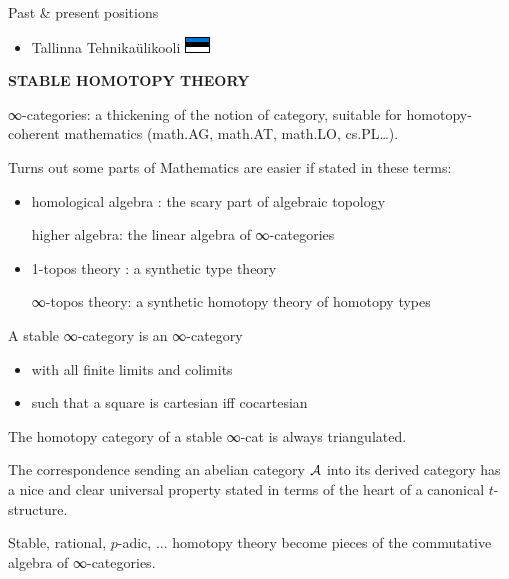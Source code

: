 \documentclass{beamer}
\def\lnk#1{\href{#1}{\faFilePdfO}}
\begin{document}
\begin{frame}{Past \& present positions}
\begin{itemize}
    \item<+-> Tallinna Tehnikaülikooli \includegraphics{est.pdf}

  \end{itemize}
\end{frame}
%
%
%
%
%
\begin{frame}
  \Huge\centering \bfseries STABLE HOMOTOPY THEORY
\end{frame}
%
\begin{frame}
  \alert{∞-categories}: a thickening of the notion of category, suitable for homotopy-coherent mathematics (math.AG, math.AT, math.LO, cs.PL\dots).

  Turns out some parts of Mathematics are easier if stated in these terms:
  \begin{itemize}
    \item<+-> {\footnotesize \color{gray!60} homological algebra : the scary part of algebraic topology}

    \lnk{www.blank.com}{\color{green} higher algebra}: the linear algebra of ∞-categories
    \item<+-> {\footnotesize \color{gray!60} 1-topos theory : a synthetic type theory}

    \lnk{www.blank.com}{\color{green} ∞-topos theory}: a synthetic homotopy theory of homotopy types
  \end{itemize}
\end{frame}
%
%
%
%
%
\begin{frame}
  A \alert{stable ∞-category} is an ∞-category
\begin{itemize}
\item with all \alert{finite limits and colimits}
\item such that a square is \alert{cartesian iff cocartesian}
\end{itemize}
\onslide<+->
The homotopy category of a stable ∞-cat is always triangulated.

\onslide<+->
The correspondence sending an abelian category $\cal A$ into its derived category has a nice and clear \alert{universal property} stated in terms of the heart of a canonical $t$-structure.

\onslide<+->
Stable, rational, $p$-adic, ...  homotopy theory become pieces of the commutative algebra of  ∞-categories.
\end{frame}
\end{document}

